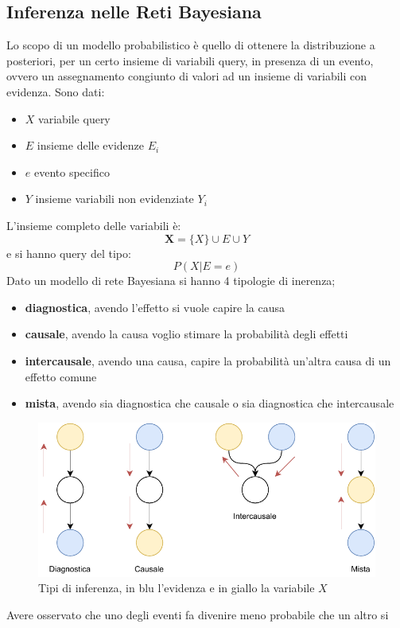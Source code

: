 \documentclass[a4paper,12pt, oneside]{book}
\begin{document}
\subsection{Inferenza nelle Reti Bayesiana}
Lo scopo di un modello probabilistico è quello di ottenere la distribuzione a
posteriori, per un certo insieme di variabili query, in presenza di un evento,
ovvero un assegnamento congiunto di valori ad un insieme di variabili con
evidenza. Sono dati:
\begin{itemize}
  \item $X$ variabile query
  \item $E$ insieme delle evidenze $E_i$
  \item $e$ evento specifico
  \item $Y$ insieme variabili non evidenziate $Y_i$
\end{itemize}
L'insieme completo delle variabili è:
\[\mathbf{X}=\{X\}\cup E\cup Y\]
e si hanno query del tipo:
\[P(X|E=e)\]
Dato un modello di rete Bayesiana si hanno 4 tipologie di inerenza;
\begin{itemize}
  \item \textbf{diagnostica}, avendo l'effetto si vuole capire la causa
  \item \textbf{causale}, avendo la causa voglio stimare la probabilità degli
  effetti 
  \item \textbf{intercausale}, avendo una causa, capire
  la probabilità un'altra causa di un effetto comune
  \item \textbf{mista}, avendo sia diagnostica che causale o sia diagnostica che
  intercausale 
\end{itemize}
\begin{figure}
  \centering
  \includegraphics[scale = 0.8]{img/inf.pdf}
  \caption{Tipi di inferenza, in blu l'evidenza e in giallo la variabile $X$}
\end{figure}
Avere osservato che uno degli eventi fa divenire meno probabile che un altro si
\end{document}

